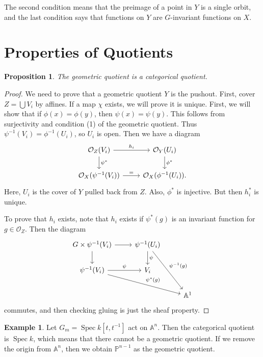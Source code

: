 \documentclass[leqno, openany]{memoir}
\newtheorem{prop}[thm]{Proposition}
\theoremstyle{definition}
\newtheorem{exm}[thm]{Example}
\theoremstyle{remark}
\theoremstyle{plain}
\theoremstyle{definition}
\theoremstyle{remark}
\newcommand{\A}{\mathbb{A}}
\renewcommand{\P}{\mathbb{P}}
\newcommand{\mc}[1]{\mathcal{#1}}
\DeclareMathOperator{\Spec}{Spec}
\begin{document}
The second condition means that the preimage of a point in $Y$ is a single orbit, and the last condition says that functions on $Y$ are $G$-invariant functions on $X$.

\section{Properties of Quotients}%
\label{sec:properties_of_quotients}

\begin{prop}
    The geometric quotient is a categorical quotient.
\end{prop}

\begin{proof}
    We need to prove that a geometric quotient $Y$ is the pushout. First, cover $Z = \bigcup V_i$ by affines. If a map $\chi$ exists, we will prove it is unique. First, we will show that if $\phi(x) = \phi(y)$, then $\psi(x) = \psi(y)$. This follows from surjectivity and condition (1) of the geometric quotient. Thus $\psi^{-1}(V_i) = \phi^{-1}(U_i)$, so $U_i$ is open. Then we have a diagram
    \begin{equation}
    \begin{tikzcd}
        \mc{O}_Z(V_i) \arrow{r}{h_i} \arrow{d}{\psi^*} & \mc{O}_Y(U_i) \arrow{d}{\phi^*} \\
        \mc{O}_X(\psi^{-1}(V_i)) \arrow{r}{=} & \mc{O}_X(\phi^{-1}(U_i)).
    \end{tikzcd}
    \end{equation}
    Here, $U_i$ is the cover of $Y$ pulled back from $Z$. Also, $\phi^*$ is injective. But then $h_i^*$ is unique.

    To prove that $h_i$ exists, note that $h_i$ exists if $\psi^*(g)$ is an invariant function for $g \in \mc{O}_Z$. Then the diagram
    \begin{equation}
    \begin{tikzcd}
        G \times \psi^{-1}(V_i) \arrow{r} \arrow{d} & \psi^{-1}(U_i) \arrow{d}{\psi} \arrow{ddr}{\psi^{-1}(g)} \\
        \psi^{-1}(V_i) \arrow{r}{\psi} \arrow{drr}{\psi^*(g)} & V_i \\
                                                              & & \A^1
    \end{tikzcd}
    \end{equation}
    commutes, and then checking gluing is just the sheaf property.
\end{proof}

\begin{exm}
    Let $G_m = \Spec k[t,t^{-1}]$ act on $\A^n$. Then the categorical quotient is $\Spec k$, which means that there cannot be a geometric quotient. If we remove the origin from $\A^n$, then we obtain $\P^{n-1}$ as the geometric quotient.
\end{exm}
\end{document}
